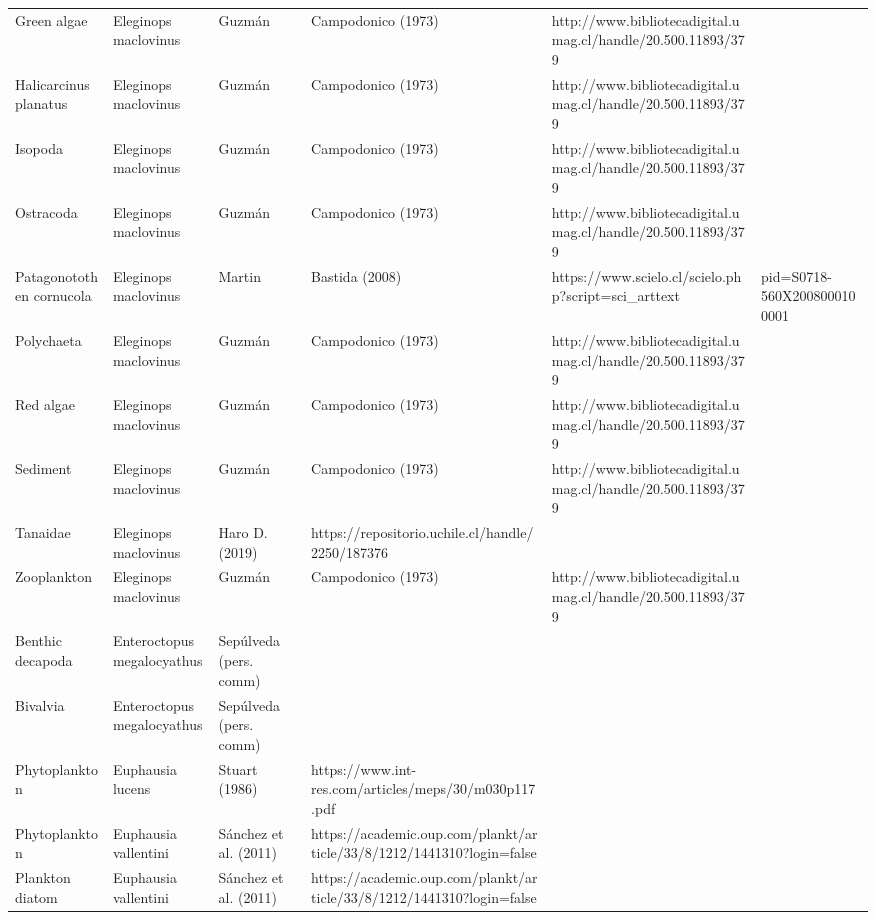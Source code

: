 \documentclass[
]{article}
\begin{document}
\begin{landscape}
\begin{longtable}[t]{>{\raggedright\arraybackslash}p{4cm}>{\centering\arraybackslash}p{4cm}>{\centering\arraybackslash}p{6cm}>{\centering\arraybackslash}p{6cm}}
Green algae & Eleginops maclovinus & \tiny Guzmán & Campodonico (1973) & \tiny http://www.bibliotecadigital.umag.cl/handle/20.500.11893/379\\
Halicarcinus planatus & Eleginops maclovinus & \tiny Guzmán & Campodonico (1973) & \tiny http://www.bibliotecadigital.umag.cl/handle/20.500.11893/379\\
Isopoda & Eleginops maclovinus & \tiny Guzmán & Campodonico (1973) & \tiny http://www.bibliotecadigital.umag.cl/handle/20.500.11893/379\\
\addlinespace
Ostracoda & Eleginops maclovinus & \tiny Guzmán & Campodonico (1973) & \tiny http://www.bibliotecadigital.umag.cl/handle/20.500.11893/379\\
Patagonotothen cornucola & Eleginops maclovinus & \tiny Martin & Bastida (2008) & \tiny https://www.scielo.cl/scielo.php?script=sci_arttext&pid=S0718-560X2008000100001\\
Polychaeta & Eleginops maclovinus & \tiny Guzmán & Campodonico (1973) & \tiny http://www.bibliotecadigital.umag.cl/handle/20.500.11893/379\\
Red algae & Eleginops maclovinus & \tiny Guzmán & Campodonico (1973) & \tiny http://www.bibliotecadigital.umag.cl/handle/20.500.11893/379\\
Sediment & Eleginops maclovinus & \tiny Guzmán & Campodonico (1973) & \tiny http://www.bibliotecadigital.umag.cl/handle/20.500.11893/379\\
\addlinespace
Tanaidae & Eleginops maclovinus & \tiny Haro D. (2019) & \tiny https://repositorio.uchile.cl/handle/2250/187376\\
Zooplankton & Eleginops maclovinus & \tiny Guzmán & Campodonico (1973) & \tiny http://www.bibliotecadigital.umag.cl/handle/20.500.11893/379\\
Benthic decapoda & Enteroctopus megalocyathus & \tiny Sepúlveda (pers. comm) & \tiny\\
Bivalvia & Enteroctopus megalocyathus & \tiny Sepúlveda (pers. comm) & \tiny\\
Phytoplankton & Euphausia lucens & \tiny Stuart (1986) & \tiny https://www.int-res.com/articles/meps/30/m030p117.pdf\\
\addlinespace
Phytoplankton & Euphausia vallentini & \tiny Sánchez et al. (2011) & \tiny https://academic.oup.com/plankt/article/33/8/1212/1441310?login=false\\
Plankton diatom & Euphausia vallentini & \tiny Sánchez et al. (2011) & \tiny https://academic.oup.com/plankt/article/33/8/1212/1441310?login=false\\

\end{longtable}
\end{landscape}
\end{document}
